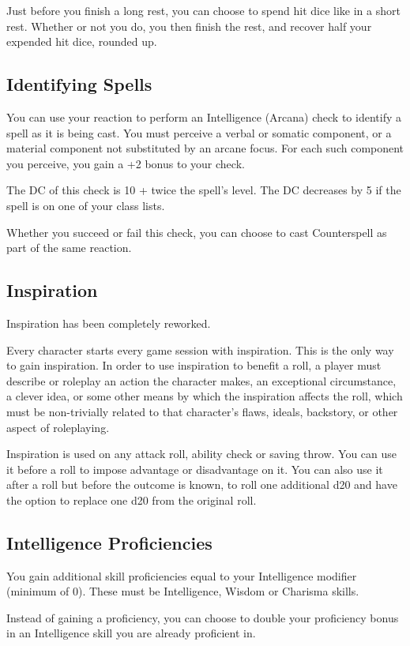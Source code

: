 \documentclass[letterpaper,twocolumn,openany,nodeprecatedcode]{dndbook}
\begin{document}
Just before you finish a long rest, you can choose to spend hit dice like in a short rest. Whether or not you do, you then finish the rest, and recover half your expended hit dice, rounded up.

\subsection{Identifying Spells}
You can use your reaction to perform an Intelligence (Arcana) check to identify a spell as it is being cast. You must perceive a verbal or somatic component, or a material component not substituted by an arcane focus. For each such component you perceive, you gain a +2 bonus to your check.

The DC of this check is 10 + twice the spell's level. The DC decreases by 5 if the spell is on one of your class lists. 

Whether you succeed or fail this check, you can choose to cast Counterspell as part of the same reaction.

\subsection{Inspiration}
Inspiration has been completely reworked.

Every character starts every game session with inspiration. This is the only way to gain inspiration. In order to use inspiration to benefit a roll, a player must describe or roleplay an action the character makes, an exceptional circumstance, a clever idea, or some other means by which the inspiration affects the roll, which must be non-trivially related to that character's flaws, ideals, backstory, or other aspect of roleplaying.

Inspiration is used on any attack roll, ability check or saving throw. You can use it before a roll to impose advantage or disadvantage on it. You can also use it after a roll but before the outcome is known, to roll one additional d20 and have the option to replace one d20 from the original roll. 

\subsection{Intelligence Proficiencies}
You gain additional skill proficiencies equal to your Intelligence modifier (minimum of 0). These must be Intelligence, Wisdom or Charisma skills. 

Instead of gaining a proficiency, you can choose to double your proficiency bonus in an Intelligence skill you are already proficient in.
\end{document}
